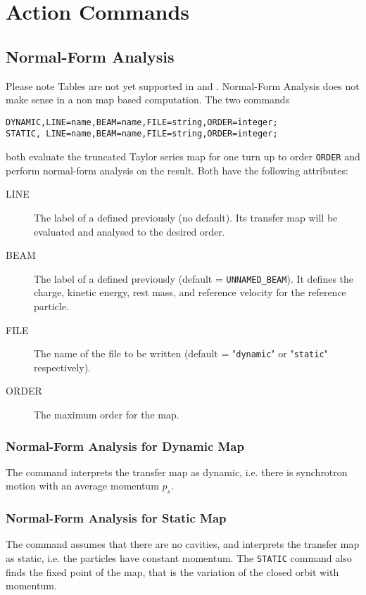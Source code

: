 \chapter{Action Commands}
\label{sec:action}

\section{Normal-Form Analysis}
Please note Tables are not yet supported in \noopalt and \noopalcycl . Normal-Form Analysis does not make sense in a non map based computation. 
The two commands
\begin{verbatim}
DYNAMIC,LINE=name,BEAM=name,FILE=string,ORDER=integer;
STATIC, LINE=name,BEAM=name,FILE=string,ORDER=integer;
\end{verbatim}
both evaluate the truncated Taylor series map for one turn up to order
\texttt{ORDER} and perform normal-form analysis on the result.
Both have the following attributes:
\begin{description}
\item[LINE]
The label of a  defined
previously (no default).  Its transfer map will be evaluated and
analysed to the desired order.
\item[BEAM]
The label of a  defined
previously (default = \texttt{UNNAMED\_BEAM}).
It defines the charge, kinetic energy, rest mass,
and reference velocity for the reference
particle. 
\item[FILE]
The name of the file to be written 
(default = "\texttt{dynamic}" or "\texttt{static}" respectively).
\item[ORDER]
The maximum order for the map.
\end{description}

\subsection{Normal-Form Analysis for Dynamic Map}
\label{sec:dynamic}
The command interprets the transfer map as dynamic,
i.e. there is synchrotron motion with an average momentum $p_s$.

\subsection{Normal-Form Analysis for Static Map}
\label{sec:static}
The command assumes that there are no cavities,
and interprets the transfer map as static,
i.e. the particles have constant momentum.
The \texttt{STATIC} command also finds the fixed point of the map,
that is the variation of the closed orbit with momentum.
